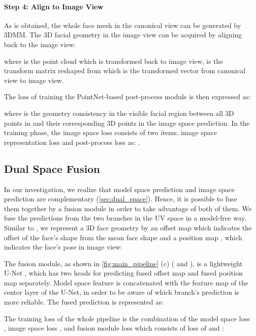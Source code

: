 \documentclass[10pt,twocolumn,letterpaper]{article}
\begin{document}
\paragraph{Step 4: Align to Image View} As  is obtained, the whole face mesh in the canonical view  can be generated by 3DMM. The 3D facial geometry in the image view  can be acquired by aligning  back to the image view:

where  is the point cloud which is transformed back to image view,  is the transform matrix reshaped from  which is the transformed vector from canonical view to image view. 

The loss of training the PointNet-based post-process module is then expressed as:

where  is the geometry consistency in the visible facial region between all 3D points in  and their corresponding 3D points  in the image space prediction.
In the training phase, the image space loss consists of two items, image space representation loss  and post-process loss  as: .



\subsection{Dual Space Fusion}
\label{subsec:meth_4}
In our investigation, we realize that model space prediction and image space prediction are complementary (\cref{sec:dual_space}). Hence, it is possible to fuse them together by a fusion module in order to take advantage of both of them. 
We fuse the predictions from the two branches in the UV space in a model-free way. 
Similar to \cite{ruan2021sadrnet}, we represent a 3D face geometry  by an offset map  which indicates the offset of the face's shape from the mean face shape and a position map ,  which indicates the face's pose in image view:


The fusion module, as shown in \cref{fig:main_pipeline} (c) ( and ), is a lightweight U-Net \cite{ronneberger2015u}, which has two heads for predicting fused offset map  and fused position map  separately. Model space feature  is concatenated with the feature map of the center layer of the U-Net, in order to be aware of which branch's prediction is more reliable. The fused prediction  is represented as:
\begin{small}

\end{small}
The training loss of the whole pipeline is the combination of the model space loss , image space loss , and fusion module loss  which consists of  loss of  and :
\end{document}
